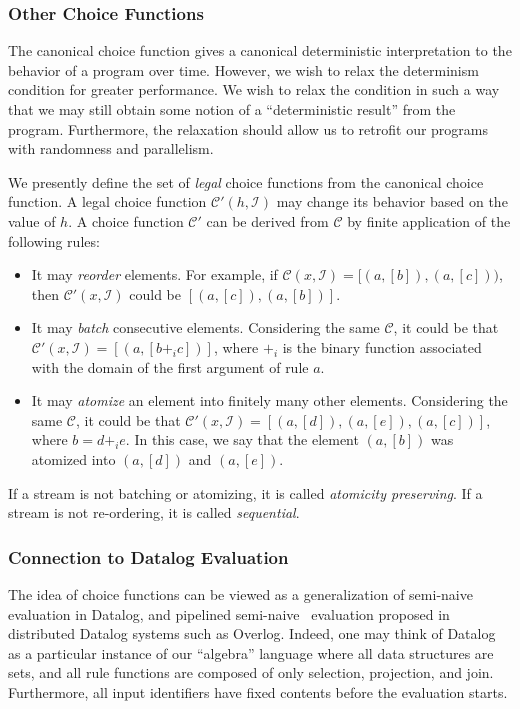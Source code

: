 \subsubsection{Other Choice Functions}

The canonical choice function gives a canonical deterministic interpretation to the behavior of a program over time.  However, we wish to relax the determinism condition for greater performance.  We wish to relax the condition in such a way that we may still obtain some notion of a ``deterministic result'' from the program.  Furthermore, the relaxation should allow us to retrofit our programs with randomness and parallelism.

We presently define the set of {\em legal} choice functions from the canonical choice function.  A legal choice function $\mathcal{C}'(h,\mathcal{I})$ may change its behavior based on the value of $h$.  A choice function $\mathcal{C}'$ can be derived from $\mathcal{C}$ by finite application of the following rules:

\begin{itemize}
\item It may {\em reorder} elements.  For example, if $\mathcal{C}(x,\mathcal{I}) = [(a,[b]), (a,[c]))$, then $\mathcal{C}'(x,\mathcal{I})$ could be $[(a,[c]),(a,[b])]$.

\item It may {\em batch} consecutive elements.  Considering the same $\mathcal{C}$, it could be that $\mathcal{C}'(x,\mathcal{I}) = [(a,[b +_i c])]$, where $+_i$ is the binary function associated with the domain of the first argument of rule $a$.

\item It may {\em atomize} an element into finitely many other elements.  Considering the same $\mathcal{C}$, it could be that $\mathcal{C}'(x,\mathcal{I}) = [(a,[d]), (a,[e]), (a,[c])]$, where $b = d +_i e$.  In this case, we say that the element $(a,[b])$ was atomized into $(a,[d])$ and $(a,[e])$.
\end{itemize}

If a stream is not batching or atomizing, it is called {\em atomicity preserving}.  If a stream is not re-ordering, it is called {\em sequential}.


\subsubsection{Connection to Datalog Evaluation}

The idea of choice functions can be viewed as a generalization of semi-naive~\cite{seminaive} evaluation in Datalog, and pipelined semi-naive~\cite{loo-sigmod06} evaluation proposed in distributed Datalog systems such as Overlog.  Indeed, one may think of Datalog as a particular instance of our ``algebra'' language where all data structures are sets, and all rule functions are composed of only selection, projection, and join.  Furthermore, all input identifiers have fixed contents before the evaluation starts.

